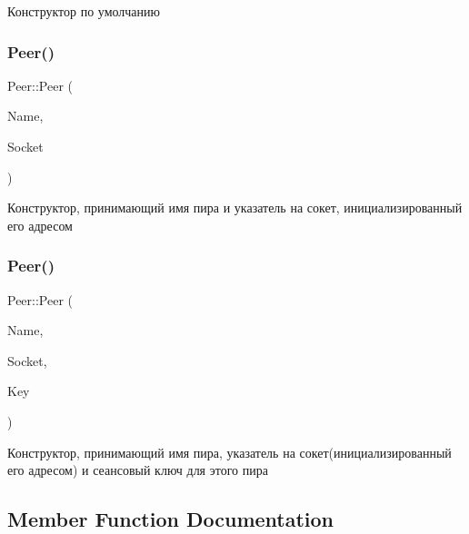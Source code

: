 Конструктор по умолчанию 

\mbox{\label{class_peer_ace891b7f4130166ef1a15e2f5f6698f6}} 
\subsubsection{\texorpdfstring{Peer()}{Peer()}\hspace{0.1cm}{\footnotesize\ttfamily [2/3]}}
{\footnotesize\ttfamily Peer\+::\+Peer (\begin{DoxyParamCaption}\item[{Q\+String}]{Name,  }\item[{std\+::shared\+\_\+ptr$<$ Q\+Tcp\+Socket $>$}]{Socket }\end{DoxyParamCaption})}



Конструктор, принимающий имя пира и указатель на сокет, инициализированный его адресом 

\mbox{\label{class_peer_aa72ba8fe59c6d161a87e398b40dd7f61}} 
\subsubsection{\texorpdfstring{Peer()}{Peer()}\hspace{0.1cm}{\footnotesize\ttfamily [3/3]}}
{\footnotesize\ttfamily Peer\+::\+Peer (\begin{DoxyParamCaption}\item[{Q\+String}]{Name,  }\item[{std\+::shared\+\_\+ptr$<$ Q\+Tcp\+Socket $>$}]{Socket,  }\item[{Q\+String}]{Key }\end{DoxyParamCaption})}



Конструктор, принимающий имя пира, указатель на сокет(инициализированный его адресом) и сеансовый ключ для этого пира 



\subsection{Member Function Documentation}
\mbox{\label{class_peer_a761fedbe29868c9c3fb3b2c0f337b18b}} 
